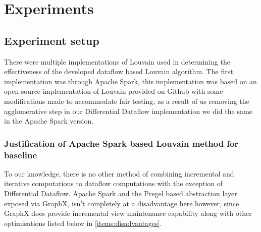 \chapter{Experiments}

\section{Experiment setup}
There were multiple implementations of Louvain used in determining the effectiveness of the developed dataflow based Louvain algorithm. The first implementation was through Apache Spark, this implementation was based on an open source implementation of Louvain provided on Github with some modifications made to accommodate fair testing, as a result of us removing the agglomerative step in our Differential Dataflow implementation we did the same in the Apache Spark version.

\subsection{Justification of Apache Spark based Louvain method for baseline}
To our knowledge, there is no other method of combining incremental and iterative computations to dataflow computations with the exception of Differential Dataflow. Apache Spark and the Pregel based abstraction layer exposed via GraphX, isn't completely at a disadvantage here however, since GraphX does provide incremental view maintenance capability along with other optimisations listed below in \cref{items:disadvantages}.

